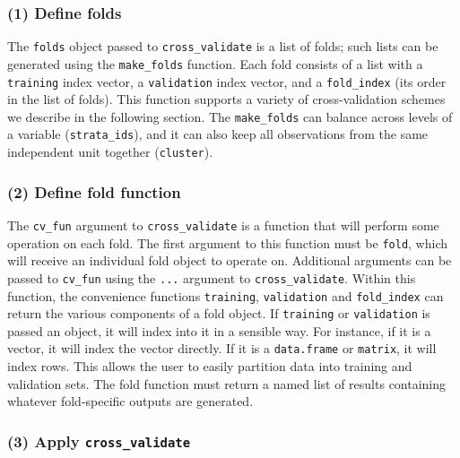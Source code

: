 \documentclass[12pt, krantz2,]{krantz}
\theoremstyle{definition}
\theoremstyle{definition}
\theoremstyle{definition}
\newcommand{\1}{\mathbbm{1}}
\begin{document}
\hypertarget{define-folds}{%
\subsubsection{(1) Define folds}\label{define-folds}}

The \texttt{folds} object passed to \texttt{cross\_validate} is a list of folds; such lists can
be generated using the \texttt{make\_folds} function. Each fold consists of a list with
a \texttt{training} index vector, a \texttt{validation} index vector, and a \texttt{fold\_index} (its
order in the list of folds). This function supports a variety of
cross-validation schemes we describe in the following section. The \texttt{make\_folds}
can balance across levels of a variable (\texttt{strata\_ids}), and it can also keep
all observations from the same independent unit together (\texttt{cluster}).

\hypertarget{define-fold-function}{%
\subsubsection{(2) Define fold function}\label{define-fold-function}}

The \texttt{cv\_fun} argument to \texttt{cross\_validate} is a function that will perform some
operation on each fold. The first argument to this function must be \texttt{fold},
which will receive an individual fold object to operate on. Additional arguments
can be passed to \texttt{cv\_fun} using the \texttt{...} argument to \texttt{cross\_validate}. Within
this function, the convenience functions \texttt{training}, \texttt{validation} and
\texttt{fold\_index} can return the various components of a fold object. If \texttt{training}
or \texttt{validation} is passed an object, it will index into it in a sensible way.
For instance, if it is a vector, it will index the vector directly. If it is a
\texttt{data.frame} or \texttt{matrix}, it will index rows. This allows the user to easily
partition data into training and validation sets. The fold function must return
a named list of results containing whatever fold-specific outputs are generated.

\hypertarget{apply-cross_validate}{%
\subsubsection{\texorpdfstring{(3) Apply \texttt{cross\_validate}}{(3) Apply cross\_validate}}\label{apply-cross_validate}}
\end{document}
